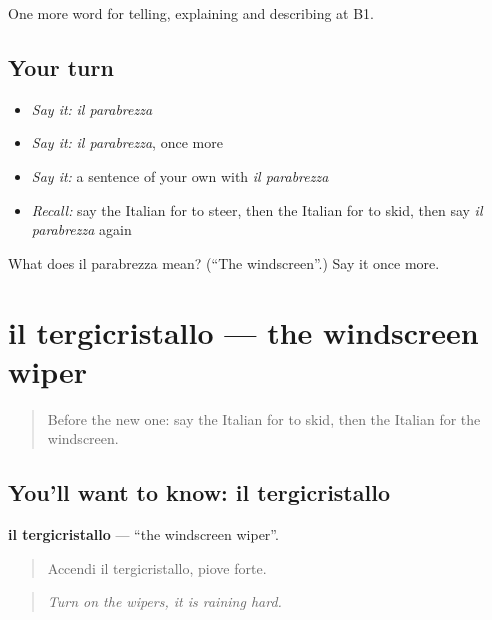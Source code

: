 \begin{grammarlens}[title={What you've built}]
One more word for telling, explaining and describing at B1.
\end{grammarlens}

\subsection*{Your turn}
\begin{itemize}
\raggedright
  \item \emph{Say it:} \emph{il parabrezza}
  \item \emph{Say it:} \emph{il parabrezza}, once more
  \item \emph{Say it:} a sentence of your own with \emph{il parabrezza}
  \item \emph{Recall:} say the Italian for to steer, then the Italian for to skid, then say \emph{il parabrezza} again
\end{itemize}

\begin{tcolorbox}[breakable,colback=teal!4,colframe=teal!35!black,title={Before you move on}]
What does il parabrezza mean? (\textquotedblleft{}The windscreen\textquotedblright{}.) Say it once more.
\end{tcolorbox}
\section[il tergicristallo]{il tergicristallo — the windscreen wiper}

\label{lesson:IT-C407-tergicristallo}



\begin{quote}
Before the new one: say the Italian for to skid, then the Italian for the windscreen.
\end{quote}

\subsection*{You'll want to know: il tergicristallo}
\textbf{il tergicristallo} — \textquotedblleft{}the windscreen wiper\textquotedblright{}.

\begin{quote}
Accendi il tergicristallo, piove forte.
\end{quote}

\begin{quote}
\emph{Turn on the wipers, it is raining hard.}
\end{quote}


